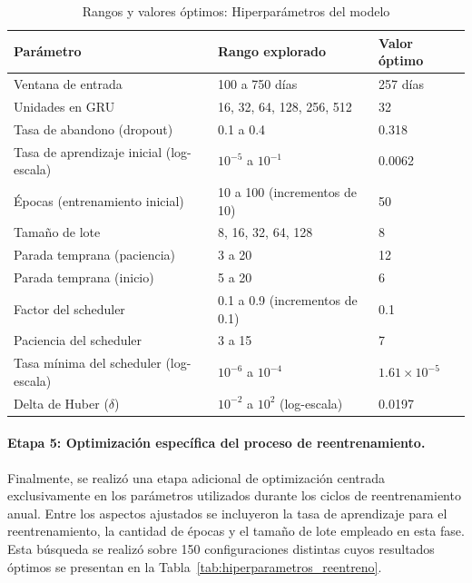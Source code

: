 \begin{table}[h]
  \centering
  \caption{Rangos y valores óptimos: Hiperparámetros del modelo}
  \label{tab:hiperparametros_modelo}
  \begin{tabular}{@{}lll@{}}
    \toprule
    \textbf{Parámetro}                            & \textbf{Rango explorado}               & \textbf{Valor óptimo} \\ \midrule
    Ventana de entrada                            & 100 a 750 días                          & 257 días              \\
    Unidades en GRU                               & 16, 32, 64, 128, 256, 512               & 32                    \\
    Tasa de abandono (dropout)                    & 0.1 a 0.4                               & 0.318                 \\
    Tasa de aprendizaje inicial (log-escala)      & $10^{-5}$ a $10^{-1}$                   & 0.0062                \\
    Épocas (entrenamiento inicial)                & 10 a 100 (incrementos de 10)            & 50                    \\
    Tamaño de lote                                 & 8, 16, 32, 64, 128                      & 8                     \\
    Parada temprana (paciencia)                   & 3 a 20                                  & 12                    \\
    Parada temprana (inicio)                      & 5 a 20                                  & 6                     \\
    Factor del scheduler                           & 0.1 a 0.9 (incrementos de 0.1)          & 0.1                   \\
    Paciencia del scheduler                        & 3 a 15                                  & 7                     \\
    Tasa mínima del scheduler (log-escala)         & $10^{-6}$ a $10^{-4}$                   & $1.61 \times 10^{-5}$ \\
    Delta de Huber ($\delta$)                      & $10^{-2}$ a $10^{2}$ (log-escala)        & 0.0197                \\ \bottomrule
  \end{tabular}
\end{table}

\paragraph{Etapa 5: Optimización específica del proceso de reentrenamiento.}
Finalmente, se realizó una etapa adicional de optimización centrada exclusivamente en los parámetros utilizados durante los ciclos de reentrenamiento anual. Entre los aspectos ajustados se incluyeron la tasa de aprendizaje para el reentrenamiento, la cantidad de épocas y el tamaño de lote empleado en esta fase. Esta búsqueda se realizó sobre 150 configuraciones distintas cuyos resultados óptimos se presentan en la Tabla~\ref{tab:hiperparametros_reentreno}.

